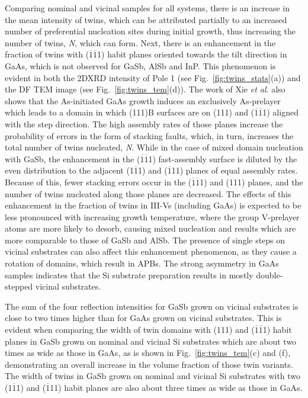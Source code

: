 Comparing nominal and vicinal samples for all systems, there is an increase in the mean intensity of twins, which can be attributed partially to an increased number of preferential nucleation sites during initial growth, thus increasing the number of twins, \textit{N}, which can form. Next, there is an enhancement in the fraction of twins with ($\overline{1}\overline{1}$1) habit planes oriented towards the tilt direction in GaAs, which is not observed for GaSb, AlSb and InP. This phenomenon is evident in both the 2DXRD intensity of Pole 1 (see Fig.~\ref{fig:twins_stats}(a)) and the DF TEM image (see Fig.~\ref{fig:twins_tem}(d)). The work of Xie \textit{et al}. also shows that the As-initiated GaAs growth induces an exclusively As-prelayer which leads to a domain in which (111)B surfaces are on (111) and ($\overline{1}\overline{1}$1) aligned with the step direction. The high assembly rates of those planes increase the probability of errors in the form of stacking faults, which, in turn, increases the total number of twins nucleated, \textit{N}. While in the case of mixed domain nucleation with GaSb, the enhancement in the ($\overline{1}\overline{1}$1) fast-assembly surface is diluted by the even distribution to the adjacent (1$\overline{1}$1) and ($\overline{1}$11) planes of equal assembly rates. Because of this, fewer stacking errors occur in the ($\overline{1}\overline{1}$1) and (111) planes, and the number of twins nucleated along those planes are decreased. The effects of this enhancement in the fraction of twins in III-Vs (including GaAs) is expected to be less pronounced with increasing growth temperature, where the group V-prelayer atoms are more likely to desorb, causing mixed nucleation and results which are more comparable to those of GaSb and AlSb. The presence of single steps on vicinal substrates can also affect this enhancement phenomenon, as they cause a rotation of domains, which result in APBs. The strong asymmetry in GaAs samples indicates that the Si substrate preparation results in mostly double-stepped vicinal substrates.

The sum of the four reflection intensities for GaSb grown on vicinal substrates is close to two times higher than for GaAs grown on vicinal substrates. This is evident when comparing the width of twin domains with (111) and ($\overline{1}\overline{1}$1) habit planes in GaSb grown on nominal and vicinal Si substrates which are about two times as wide as those in GaAs, as is shown in Fig.~\ref{fig:twins_tem}(c) and (f), demonstrating an overall increase in the volume fraction of those twin variants. The width of twins in GaSb grown on nominal and vicinal Si substrates with two (1$\overline{1}$1) and ($\overline{1}$11) habit planes are also about three times as wide as those in GaAs.

